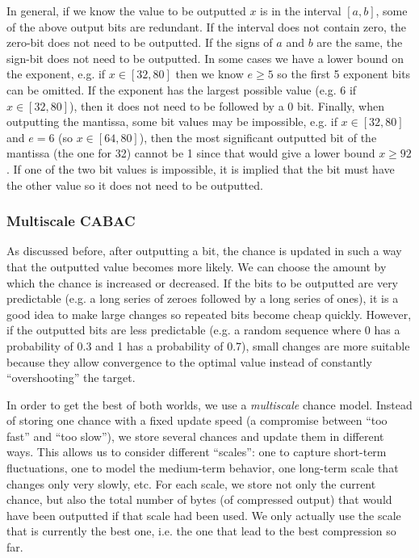 \documentclass[a4paper,USenglish]{lipics}
\begin{document}
In general, if we know the value to be outputted $x$ is in the interval $[a,b]$, some of the
above output bits are redundant. If the interval does not contain zero, the zero-bit does not
need to be outputted. If the signs of $a$ and $b$ are the same, the sign-bit does not need to be
outputted. In some cases we have a lower bound on the exponent, e.g. if $x \in [32,80]$ then
we know $e \geq 5$ so the first 5 exponent bits can be omitted. If the exponent has the largest
possible value (e.g. 6 if $x \in [32,80]$), then it does not need to be followed by a 0 bit.
Finally, when outputting the mantissa, some bit values may be impossible, e.g. if $x \in [32,80]$ and
$e=6$ (so $x \in [64,80]$), then the most significant outputted bit of the mantissa
(the one for 32) cannot be 1 since that would give a lower bound $x \geq 92$.
If one of the two bit values is impossible, it is implied that the bit must have the other value
so it does not need to be outputted.





\subsubsection{Multiscale CABAC}
\label{sec:multiscale}

As discussed before, after outputting a bit, the chance is updated in such a way that
the outputted value becomes more likely. We can choose the amount by which
the chance is increased or decreased. If the bits to be outputted are very predictable
(e.g. a long series of zeroes followed by a long series of ones),
it is a good idea to make large changes so repeated bits become cheap quickly.
However, if the outputted bits are less predictable (e.g. a random sequence where 0 has a probability
of 0.3 and 1 has a probability of 0.7), small changes are more suitable because
they allow convergence to the optimal value instead of constantly ``overshooting'' the target.

In order to get the best of both worlds, we use a {\em multiscale} chance model.
Instead of storing one chance with a fixed update speed
(a compromise between ``too fast'' and ``too slow''),
we store several chances and update them in different ways.
This allows us to consider different ``scales'': one to capture short-term fluctuations,
one to model the medium-term behavior, one long-term scale that changes only very slowly, etc.
For each scale, we store not only the current chance, but also the total number of bytes
(of compressed output)
that would have been outputted if that scale had been used.
We only actually use the scale that is currently the best one, i.e. the one that lead to the best
compression so far.
\end{document}
